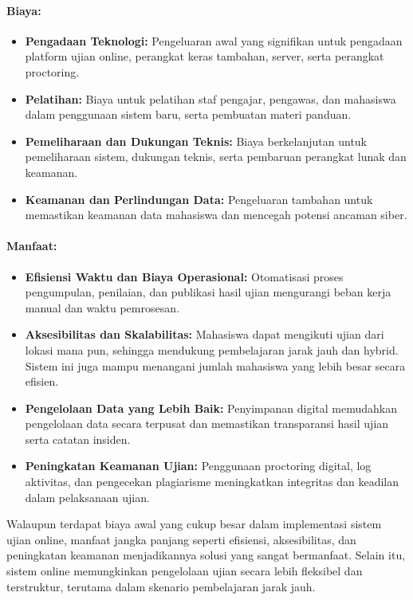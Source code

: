 \paragraph{Biaya:}
\begin{itemize}
	\item \textbf{Pengadaan Teknologi:} Pengeluaran awal yang signifikan untuk pengadaan platform ujian online, perangkat keras tambahan, server, serta perangkat proctoring.
	\item \textbf{Pelatihan:} Biaya untuk pelatihan staf pengajar, pengawas, dan mahasiswa dalam penggunaan sistem baru, serta pembuatan materi panduan.
	\item \textbf{Pemeliharaan dan Dukungan Teknis:} Biaya berkelanjutan untuk pemeliharaan sistem, dukungan teknis, serta pembaruan perangkat lunak dan keamanan.
	\item \textbf{Keamanan dan Perlindungan Data:} Pengeluaran tambahan untuk memastikan keamanan data mahasiswa dan mencegah potensi ancaman siber.
\end{itemize}

\paragraph{Manfaat:}
\begin{itemize}
	\item \textbf{Efisiensi Waktu dan Biaya Operasional:} Otomatisasi proses pengumpulan, penilaian, dan publikasi hasil ujian mengurangi beban kerja manual dan waktu pemrosesan.
	\item \textbf{Aksesibilitas dan Skalabilitas:} Mahasiswa dapat mengikuti ujian dari lokasi mana pun, sehingga mendukung pembelajaran jarak jauh dan hybrid. Sistem ini juga mampu menangani jumlah mahasiswa yang lebih besar secara efisien.
	\item \textbf{Pengelolaan Data yang Lebih Baik:} Penyimpanan digital memudahkan pengelolaan data secara terpusat dan memastikan transparansi hasil ujian serta catatan insiden.
	\item \textbf{Peningkatan Keamanan Ujian:} Penggunaan proctoring digital, log aktivitas, dan pengecekan plagiarisme meningkatkan integritas dan keadilan dalam pelaksanaan ujian.
\end{itemize}

Walaupun terdapat biaya awal yang cukup besar dalam implementasi sistem ujian online, manfaat jangka panjang seperti efisiensi, aksesibilitas, dan peningkatan keamanan menjadikannya solusi yang sangat bermanfaat. Selain itu, sistem online memungkinkan pengelolaan ujian secara lebih fleksibel dan terstruktur, terutama dalam skenario pembelajaran jarak jauh.



